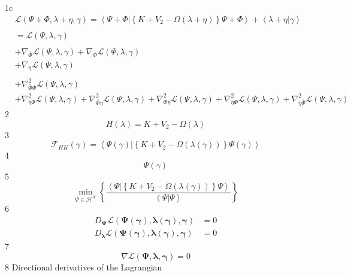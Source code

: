 \documentclass[aps,preprint]{revtex4}%
\begin{document}
1c%
\begin{align*}
&  \mathcal{L}\left(  \Psi+\Phi,\lambda+\eta,\gamma\right)  =\left\langle
\left.  \Psi+\Phi\right\vert \left\{  K+V_{2}-\Omega\left(  \lambda
+\eta\right)  \right\}  \Psi+\Phi\right\rangle +\left\langle \lambda
+\eta\left\vert \gamma\right.  \right\rangle \\
& \\
&  =\mathcal{L}\left(  \Psi,\lambda,\gamma\right) \\
& \\
&  +\nabla_{\bar{\Phi}}\mathcal{L}\left(  \Psi,\lambda,\gamma\right)
+\nabla_{\Phi}\mathcal{L}\left(  \Psi,\lambda,\gamma\right) \\
&  +\nabla_{\eta}\mathcal{L}\left(  \Psi,\lambda,\gamma\right) \\
& \\
&  +\nabla_{\bar{\Phi}\Phi}^{2}\mathcal{L}\left(  \Psi,\lambda,\gamma\right)
\\
&  +\nabla_{\eta\Phi}^{2}\mathcal{L}\left(  \Psi,\lambda,\gamma\right)
+\nabla_{\bar{\Phi}\eta}^{2}\mathcal{L}\left(  \Psi,\lambda,\gamma\right)
+\nabla_{\Phi\eta}^{2}\mathcal{L}\left(  \Psi,\lambda,\gamma\right)
+\nabla_{\eta\Phi}^{2}\mathcal{L}\left(  \Psi,\lambda,\gamma\right)
+\nabla_{\eta\bar{\Phi}}^{2}\mathcal{L}\left(  \Psi,\lambda,\gamma\right)
\end{align*}
2%
\[
H\left(  \lambda\right)  =K+V_{2}-\Omega\left(  \lambda\right)
\]
3%
\[
\mathcal{F}_{HK}\left(  \gamma\right)  =\left\langle \left.  \Psi\left(
\gamma\right)  \right\vert \left\{  K+V_{2}-\Omega\left(  \lambda\left(
\gamma\right)  \right)  \right\}  \Psi\left(  \gamma\right)  \right\rangle
\]
4%
\[
\Psi\left(  \gamma\right)
\]
5%
\[
\min_{\Psi\in\mathcal{H}^{N}}\left\{  \frac{\left\langle \left.
\Psi\right\vert \left\{  K+V_{2}-\Omega\left(  \lambda\left(  \gamma\right)
\right)  \right\}  \Psi\right\rangle }{\left\langle \left.  \Psi\right\vert
\Psi\right\rangle }\right\}
\]
6%
\begin{align*}
D_{\mathbf{\Psi}}\mathcal{L}\left(  \mathbf{\Psi}\left(  \mathbf{\gamma
}\right)  \mathbf{,\lambda\left(  \mathbf{\gamma}\right)  ,\gamma}\right)   &
=0\\
D_{\mathbf{\lambda}}\mathcal{L}\left(  \mathbf{\Psi}\left(  \mathbf{\gamma
}\right)  \mathbf{,\lambda\left(  \mathbf{\gamma}\right)  ,\gamma}\right)   &
=0
\end{align*}
7%
\[
\nabla\mathcal{L}\left(  \mathbf{\Psi,\lambda,\gamma}\right)  =0
\]
8 \quad Directional derivatives of the Lagrangian
\end{document}

